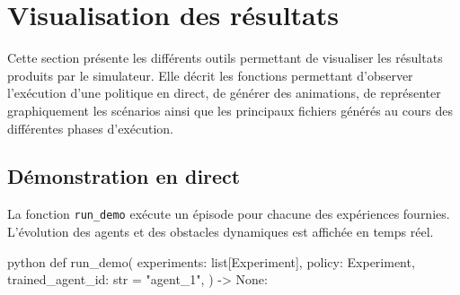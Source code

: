 \section{Visualisation des résultats}
\label{sec:visualisation_resultats}

\noindent Cette section présente les différents outils permettant de visualiser les résultats produits par le simulateur. Elle décrit les fonctions permettant d'observer l'exécution d'une politique en direct, de générer des animations, de représenter graphiquement les scénarios ainsi que les principaux fichiers générés au cours des différentes phases d'exécution.

\subsection{Démonstration en direct}

\noindent La fonction \texttt{run\_demo} exécute un épisode pour chacune des expériences fournies. L'évolution des agents et des obstacles dynamiques est affichée en temps réel.

\begin{codebox}{python}
def run_demo(
    experiments: list[Experiment],
    policy: Experiment,
    trained_agent_id: str = "agent_1",
) -> None:
\end{codebox}


